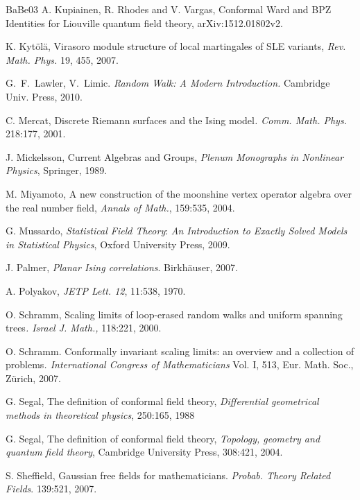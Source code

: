 \documentclass[12pt,oneside,english]{amsart}
\numberwithin{equation}{section}
\numberwithin{figure}{section}
\theoremstyle{plain}
\theoremstyle{plain}
\theoremstyle{plain}
\theoremstyle{plain}
\theoremstyle{remark}
\theoremstyle{definition}
\theoremstyle{plain}
\theoremstyle{plain}
\numberwithin{thm}{section}
\begin{document}
\begin{thebibliography}{BaBe03}
A. Kupiainen, R. Rhodes and
V. Vargas, Conformal Ward and BPZ Identities for Liouville quantum
field theory, arXiv:1512.01802v2.

K. Kyt\"ol\"a, Virasoro module structure of local
martingales of SLE variants, \emph{Rev. Math. Phys.} 19, 455, 2007.

G.~F.~Lawler, V.~Limic.
\emph{Random Walk: A Modern Introduction.}
Cambridge Univ. Press, 2010.

C. Mercat, Discrete Riemann surfaces and the
Ising model\emph{. Comm. Math. Phys. }218:177, 2001.

J. Mickelsson, Current Algebras and Groups,
\emph{Plenum Monographs in Nonlinear Physics}, Springer, 1989.

M. Miyamoto, A new construction of the moonshine
vertex operator algebra over the real number field, \emph{Annals of
Math.}, 159:535, 2004.

G. Mussardo, \emph{Statistical Field Theory}:\emph{
An Introduction to Exactly Solved Models in Statistical Physics},
Oxford University Press, 2009.

J. Palmer, \emph{Planar Ising correlations}.
Birkh\"auser, 2007.

A. Polyakov, \emph{JETP Lett. 12}, 11:538,
1970.

O. Schramm, Scaling limits of loop-erased
random walks and uniform spanning trees\emph{. Israel J. Math.,} 
118:221,
2000.

O. Schramm. Conformally invariant scaling
limits: an overview and a collection of problems\emph{. International
Congress of Mathematicians }Vol. I, 513, Eur. Math.
Soc., Zürich, 2007.

G. Segal, The definition of conformal field
theory, \emph{Differential geometrical methods in theoretical physics},
250:165, 1988

G. Segal, The definition of conformal field
theory,\emph{ Topology, geometry and quantum field theory}, Cambridge
University Press, 308:421, 2004.

S. Sheffield, Gaussian free fields for
mathematicians. \emph{Probab. Theory Related Fields}. 139:521,
2007.


\end{thebibliography}
\end{document}
